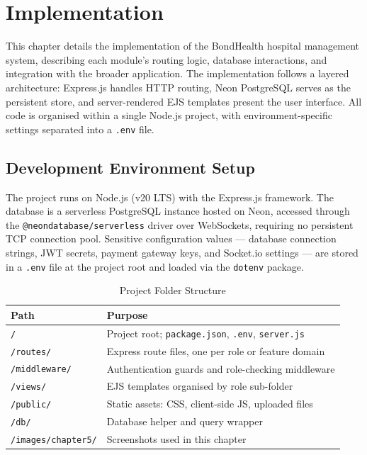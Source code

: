 \chapter{Implementation}
\label{ch:implementation}

This chapter details the implementation of the BondHealth hospital management system, describing each module's routing logic, database interactions, and integration with the broader application. The implementation follows a layered architecture: Express.js handles HTTP routing, Neon PostgreSQL serves as the persistent store, and server-rendered EJS templates present the user interface. All code is organised within a single Node.js project, with environment-specific settings separated into a \texttt{.env} file.

\section{Development Environment Setup}
\label{sec:dev-env}

The project runs on Node.js (v20 LTS) with the Express.js framework. The database is a serverless PostgreSQL instance hosted on Neon, accessed through the \texttt{@neondatabase/serverless} driver over WebSockets, requiring no persistent TCP connection pool. Sensitive configuration values — database connection strings, JWT secrets, payment gateway keys, and Socket.io settings — are stored in a \texttt{.env} file at the project root and loaded via the \texttt{dotenv} package.

\vspace{1em}
\begin{table}[ht]
\centering
\begin{tabular}{ll}
\hline
\textbf{Path} & \textbf{Purpose} \\
\hline
\texttt{/} & Project root; \texttt{package.json}, \texttt{.env}, \texttt{server.js} \\
\texttt{/routes/} & Express route files, one per role or feature domain \\
\texttt{/middleware/} & Authentication guards and role-checking middleware \\
\texttt{/views/} & EJS templates organised by role sub-folder \\
\texttt{/public/} & Static assets: CSS, client-side JS, uploaded files \\
\texttt{/db/} & Database helper and query wrapper \\
\texttt{/images/chapter5/} & Screenshots used in this chapter \\
\hline
\end{tabular}
\caption{Project Folder Structure}
\label{tab:folder-structure}
\end{table}

